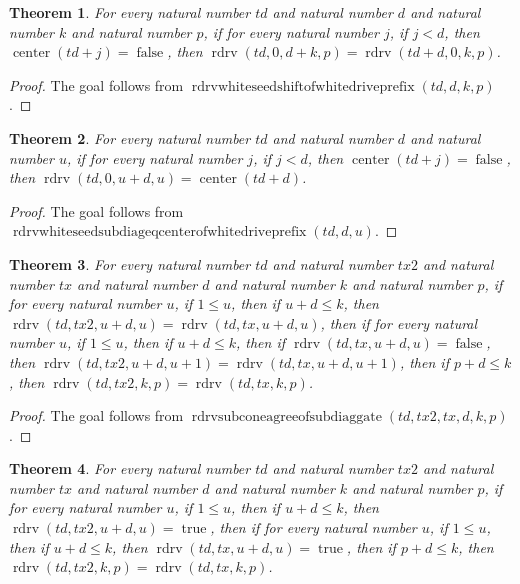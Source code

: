 \documentclass[11pt]{article}
\newtheorem{theorem}{Theorem}[section]
\theoremstyle{definition}
\begin{document}
\begin{theorem}
\label{ll:paper:rdrv-white-seed-shift-of-white-drive-prefix}
For every natural number \(td\) and natural number \(d\) and natural number \(k\) and natural number \(p\), if for every natural number \(j\), if \(j < d\), then \(\operatorname{center}(td + j) = \operatorname{false}\), then \(\operatorname{rdrv}(td, 0, d + k, p) = \operatorname{rdrv}(td + d, 0, k, p)\).
\end{theorem}
\begin{proof}
The goal follows from \(\operatorname{rdrvwhiteseedshiftofwhitedriveprefix}(td, d, k, p)\).
\end{proof}
\begin{theorem}
\label{ll:paper:rdrv-white-seed-subdiag-eq-center-of-white-drive-prefix}
For every natural number \(td\) and natural number \(d\) and natural number \(u\), if for every natural number \(j\), if \(j < d\), then \(\operatorname{center}(td + j) = \operatorname{false}\), then \(\operatorname{rdrv}(td, 0, u + d, u) = \operatorname{center}(td + d)\).
\end{theorem}
\begin{proof}
The goal follows from \(\operatorname{rdrvwhiteseedsubdiageqcenterofwhitedriveprefix}(td, d, u)\).
\end{proof}
\begin{theorem}
\label{ll:paper:rdrv-subcone-agree-of-subdiag-gate}
For every natural number \(td\) and natural number \(tx2\) and natural number \(tx\) and natural number \(d\) and natural number \(k\) and natural number \(p\), if for every natural number \(u\), if \(1 \le u\), then if \(u + d \le k\), then \(\operatorname{rdrv}(td, tx2, u + d, u) = \operatorname{rdrv}(td, tx, u + d, u)\), then if for every natural number \(u\), if \(1 \le u\), then if \(u + d \le k\), then if \(\operatorname{rdrv}(td, tx, u + d, u) = \operatorname{false}\), then \(\operatorname{rdrv}(td, tx2, u + d, u + 1) = \operatorname{rdrv}(td, tx, u + d, u + 1)\), then if \(p + d \le k\), then \(\operatorname{rdrv}(td, tx2, k, p) = \operatorname{rdrv}(td, tx, k, p)\).
\end{theorem}
\begin{proof}
The goal follows from \(\operatorname{rdrvsubconeagreeofsubdiaggate}(td, tx2, tx, d, k, p)\).
\end{proof}
\begin{theorem}
\label{ll:paper:rdrv-subcone-agree-of-black-subdiag}
For every natural number \(td\) and natural number \(tx2\) and natural number \(tx\) and natural number \(d\) and natural number \(k\) and natural number \(p\), if for every natural number \(u\), if \(1 \le u\), then if \(u + d \le k\), then \(\operatorname{rdrv}(td, tx2, u + d, u) = \operatorname{true}\), then if for every natural number \(u\), if \(1 \le u\), then if \(u + d \le k\), then \(\operatorname{rdrv}(td, tx, u + d, u) = \operatorname{true}\), then if \(p + d \le k\), then \(\operatorname{rdrv}(td, tx2, k, p) = \operatorname{rdrv}(td, tx, k, p)\).
\end{theorem}
\end{document}
